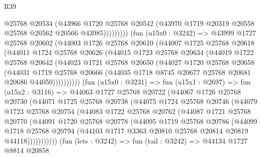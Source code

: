 \begin{lexlean}{R39}
\begin{coremodule}
                      @25768
                      @20534
                      (@43966
                        @1720
                        @25768
                        @20542
                        (@43970 @1719 @20319 @20558 @25768 @20562 @20566 @43985)))))))))
        (fun (u15x0 : @3242) =>
        @43999
          @1727
          @25768
          @20602
          (@44003
            @1726
            @25768
            @20610
            (@44007
              @1725
              @25768
              @20618
              (@44011
                @1724
                @25768
                @20626
                (@44015
                  @1723
                  @25768
                  @20634
                  (@44019
                    @1722
                    @25768
                    @20642
                    (@44023
                      @1721
                      @25768
                      @20650
                      (@44027
                        @1720
                        @25768
                        @20658
                        (@44031
                          @1719
                          @25768
                          @20666
                          (@44035 @1718 @8745 @20677 @25768 @20681 @20686 @44050))))))))))
        (fun (u15x0 : @3231) =>
        fun (u15x1 : @2697) =>
        fun (u15x2 : @3116) =>
        @44063
          @1727
          @25768
          @20722
          (@44067
            @1726
            @25768
            @20730
            (@44071
              @1725
              @25768
              @20738
              (@44075
                @1724
                @25768
                @20746
                (@44079
                  @1723
                  @25768
                  @20754
                  (@44083
                    @1722
                    @25768
                    @20762
                    (@44087
                      @1721
                      @25768
                      @20770
                      (@44091
                        @1720
                        @25768
                        @20778
                        (@44095
                          @1719
                          @25768
                          @20786
                          (@44099
                            @1718
                            @25768
                            @20794
                            (@44103 @1717 @3363 @20810 @25768 @20814 @20819 @44118)))))))))))
        (fun (lets : @3242) =>
        fun (tail : @3242) =>
        @44134
          @1727
          @8814
          @20858

\end{coremodule}
\end{lexlean}
